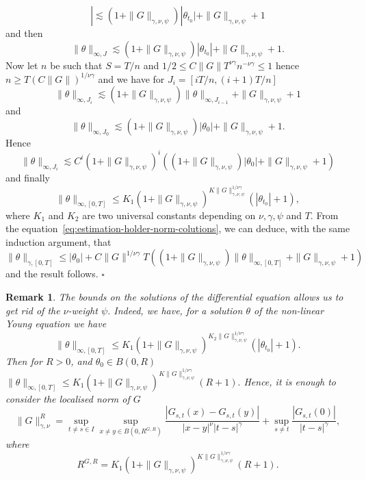\documentclass[a4paper,11pt]{article}
\newtheorem{remark}[theorem]{Remark}
\newenvironment{proof}{{\sc Proof.}}{\hfill$\square$}
\begin{document}
\begin{proof}
\[     | \lesssim ( 1+ \| G \|_{\gamma , \nu , \psi} ) | \theta_{t_{0}} | + \| G
     \|_{\gamma , \nu , \psi} +1 \]
  and then
  \[ \| \theta \|_{\infty ,J} \lesssim ( 1+ \| G \|_{\gamma , \nu , \psi} ) |
     \theta_{t_{0}} | + \| G \|_{\gamma , \nu , \psi} +1. \]
  Now let $n$ be such that $S=T/n$ and $1/2 \leqslant C  \| G \| T^{\nu \gamma}
  n^{- \nu \gamma} \leqslant 1$ hence $n \geqslant T ( C \| G \| )^{1/ \nu
  \gamma}$ and we have for $J_{i} = [ i T/n, ( i+1 ) T/n ]$
  \[ \| \theta \|_{\infty ,J_{i}} \lesssim ( 1+ \| G \|_{\gamma , \nu , \psi}
     ) \| \theta \|_{\infty ,J_{i-1}} + \| G \|_{\gamma , \nu , \psi} +1 \]
  and
  \[ \| \theta \|_{\infty ,J_{0}} \lesssim ( 1+ \| G \|_{\gamma , \nu , \psi}
     ) | \theta_{0} | + \| G \|_{\gamma , \nu , \psi} +1. \]
  Hence
  \[ \| \theta \|_{\infty ,J_{i}} \lesssim C^{i} ( 1+ \| G \|_{\gamma , \nu ,
     \psi} )^{i} ( ( 1+ \| G \|_{\gamma , \nu , \psi} ) | \theta_{0} | + \| G
     \|_{\gamma , \nu , \psi} +1 ) \]
  and finally
  \[ \| \theta \|_{\infty , [ 0,T ]} \leqslant K_{1} ( 1+ \| G \|_{\gamma ,
     \nu , \psi} )^{K \| G \|_{\gamma , \nu , \psi}^{1/ \nu \gamma}} ( |
     \theta_{t_{0}} | +1 ), \]
  where $K_{1}$ and $K_{2}$ are two universal constants depending on $\nu ,
  \gamma , \psi  $ and $T$. From the
  equation~{\eqref{eq:estimation-holder-norm-colutions}}, we can deduce,
  with the same induction argument, that
  \[ \| \theta \|_{\gamma , [ 0,T ]} \leqslant | \theta_{0} | +C \| G \|^{1/
     \nu \gamma} T ( ( 1+ \| G \|_{\gamma , \nu , \psi} ) \| \theta \|_{\infty
     , [ 0,T ]} + \| G \|_{\gamma , \nu , \psi} +1 ) \]
  and the result follows.
\end{proof}

\begin{remark}
  \label{remark:localization_principle}The bounds on the solutions of the
  differential equation allows us to get rid of the $\nu$-weight $\psi$.
  Indeed, we have, for a solution $\theta$ of the non-linear Young equation we
  have
  \[ \| \theta \|_{\infty , [ 0,T ]} \leqslant K_{1} ( 1+ \| G \|_{\gamma ,
     \nu , \psi} )^{K_{2} \| G \|_{\gamma , \nu , \psi}^{1/ \nu \gamma}} ( |
     \theta_{t_{0}} | +1 ) . \]
  Then for $R>0$, and $\theta_{0} \in B ( 0,R )$ $\| \theta \|_{\infty , [ 0,T
  ]} \leqslant K_{1} ( 1+ \| G \|_{\gamma , \nu , \psi} )^{K \| G \|_{\gamma ,
  \nu , \psi}^{1/ \nu \gamma}} ( R+1 ) .$ Hence, it is enough to consider the
  localised norm of $G$
  \[ \| G \|^{R}_{\gamma , \nu} = \sup_{t \neq s \in I} \sup_{x \neq y \in B (
     0,R^{G,R} )} \frac{| G_{s,t} ( x ) -G_{s,t} ( y ) |}{| x-y |^{\nu} | t-s
     |^{\gamma}} + \sup_{s \neq t} \frac{| G_{s,t} ( 0 ) |}{| t-s |^{\gamma}},
  \]
  where
  \[ R^{G,R} =K_{1} ( 1+ \| G \|_{\gamma , \nu , \psi} )^{K \| G \|_{\gamma ,
     \nu , \psi}^{1/ \nu \gamma}} ( R+1 ) . \]
\end{remark}
\end{document}
